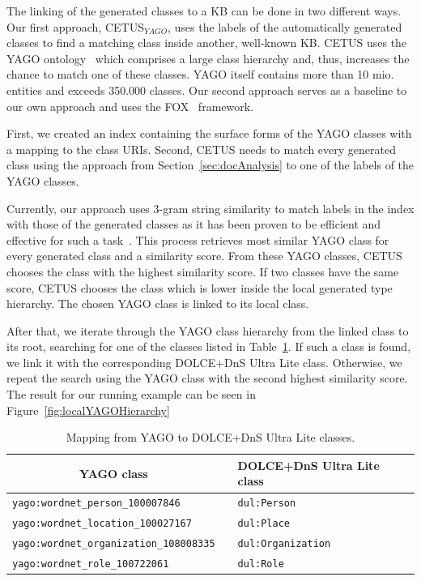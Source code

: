 
The linking of the generated classes to a \ac{KB} can be done in two different ways.
Our first approach, CETUS$_{YAGO}$,  uses the labels of the automatically generated classes to find a matching class inside another, well-known \ac{KB}.
CETUS uses the YAGO ontology~\cite{mahdisoltani2014yago3} which comprises a large class hierarchy and, thus, increases the chance to match one of these classes.
YAGO itself contains more than 10 mio. entities and exceeds 350.000 classes.
Our second approach serves as a baseline to our own approach and uses the FOX~\cite{FOX} framework.

First, we created an index containing the surface forms of the YAGO classes with a mapping to the class URIs.
Second, CETUS needs to match every generated class using the approach from Section~\ref{sec:docAnalysis} to one of the labels of the YAGO classes.

Currently, our approach uses 3-gram string similarity to match labels in the index with those of the generated classes as it has been proven to be efficient and effective for such a task~\cite{agdistis_iswc}.
This process retrieves most similar YAGO class for every generated class and a similarity score.
From these YAGO classes, CETUS chooses the class with the highest similarity score.
If two classes have the same score, CETUS chooses the class which is lower inside the local generated type hierarchy.
The chosen YAGO class is linked to its local class.

After that, we iterate through the YAGO class hierarchy from the linked class to its root, searching for one of the classes listed in Table~\ref{tab:yagoClassMatching}.
If such a class is found, we link it with the corresponding DOLCE+DnS Ultra Lite class.
Otherwise, we repeat the search using the YAGO class with the second highest similarity score.
The result for our running example can be seen in Figure~\ref{fig:localYAGOHierarchy}
\begin{table}[htb!]
\centering
\begin{tabular}{lp{5mm}l}
\toprule
 \multicolumn{1}{c}{YAGO class} && DOLCE+DnS Ultra Lite class \\
\midrule
 \texttt{yago:wordnet\_person\_100007846} && \texttt{dul:Person} \\
 \texttt{yago:wordnet\_location\_100027167} && \texttt{dul:Place} \\
 \texttt{yago:wordnet\_organization\_108008335} && \texttt{dul:Organization} \\
 \texttt{yago:wordnet\_role\_100722061} && \texttt{dul:Role} \\
\bottomrule
\end{tabular}
\caption{Mapping from YAGO to DOLCE+DnS Ultra Lite classes.}
\label{tab:yagoClassMatching}
\end{table}

